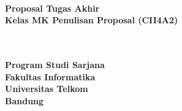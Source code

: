 {\centering
\large
{\bigsize\bf \Title}\\
\vspace{ 3cm}
\rm
\textbf{Proposal Tugas Akhir}\\
\vspace{0.5 cm}
\textbf{Kelas MK Penulisan Proposal (CII4A2)}\\
\vspace{0.5 cm}
 \textbf{\NIM}\\ \textbf{\Author}\\

\vspace{1.5 cm}

\begin{figure}[h]
{\par}
\end{figure}

\vspace{1.5 cm}
{\bigsize\textbf{Program Studi Sarjana \Prodi}\\
\vspace{0.5 cm}
\textbf{Fakultas Informatika}\\
\vspace{0.5 cm}
\textbf{Universitas Telkom}\\
\vspace{0.5 cm}
\textbf{Bandung}\\
\vspace{0.5 cm}
\textbf{\Date}\\}
}